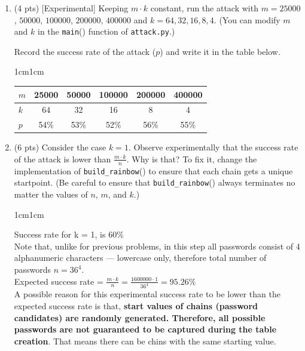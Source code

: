 \documentclass[11pt,letterpaper]{article}
\newenvironment{answer}{\em \color{blue} \begin{adjustwidth}{1cm}{1cm}}{\end{adjustwidth}}
\begin{document}
\begin{enumerate}
		\item (4 pts) [Experimental] Keeping $m \cdot k$ constant, run the attack with $m = 25000$, $50000$, $100000$, $200000$, $400000$ and $k = 64, 32, 16, 8, 4$. (You can modify $m$ and $k$ in the \texttt{main}() function of \texttt{attack.py}.) 
		
		Record the success rate of the attack ($p$) and write it in the table below.
		
		\begin{answer}
			
			\begin{center}
				\begin{tabular}{l|c|c|c|c|c|}
					\hline
					$m$ & 25000 & 50000 & 100000 & 200000 & 400000 \\ \hline
					$k$ & 64 & 32    & 16      & 8      & 4      \\ \hline \hline
					$p$ & 54\% & 53\%  &  52\%  & 56\%  &  55\%   \\ \hline
				\end{tabular}	
			\end{center}	
			
		\end{answer}
		
		\item (6 pts) Consider the case $k=1$. Observe experimentally that the success rate of the attack is lower than $\frac{m \cdot k}{n}$. Why is that?  To fix it, change the implementation of \texttt{build\_rainbow}() to ensure that each chain gets a unique startpoint. (Be careful to ensure that \texttt{build\_rainbow}() always terminates no matter the values of $n$, $m$, and $k$.)
		
		\begin{answer}
			
			Success rate for k = 1, is 60\%\\
			
			Note that, unlike for previous problems, in this step all passwords consist of 4 alphanumeric characters --- lowercase only, therefore total number of passwords $n = 36^4$.\\
			
			Expected success rate = $\frac{m \cdot k}{n} = \frac{1600000 \cdot 1}{36^4} = 95.26\% $\\
			
			A possible reason for this experimental success rate to be lower than the expected success rate is that, \textbf{start values of chains (password candidates) are randomly generated. Therefore, all possible passwords are not guaranteed to be captured during the table creation}. That means there can be chins with the same starting value.
			

\end{answer}
\end{enumerate}
\end{document}
